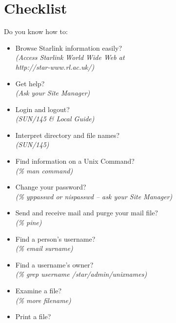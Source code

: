\documentclass[twoside]{article}
\newcommand{\htmladdnormallink}[2]{#1}
\newcommand{\xref}[3]{#1}
\begin{document}
\newpage

\section {\label{AppendixB}Checklist}
Do you know how to:
\begin{itemize}
\item Browse Starlink information easily?\\
\hspace*{10mm} {\em (Access
               \htmladdnormallink{Starlink World Wide Web}
                                 {http://star-www.rl.ac.uk/} at\\
\hspace*{10mm} http://star-www.rl.ac.uk/)}
\item Get help?\\
\hspace*{10mm} {\em (Ask your Site Manager)}
\item Login and logout?\\
\hspace*{10mm} {\em (\xref{SUN/145}{sun145}{} \& Local Guide)}
\item Interpret directory and file names?\\
\hspace*{10mm} {\em (\xref{SUN/145}{sun145}{})}
\item Find information on a Unix Command?\\
\hspace*{10mm} {\em (\% man command)}
\item Change your password?\\
\hspace*{10mm} {\em (\% yppasswd or nispasswd -- ask your Site Manager)}
\item Send and receive mail and purge your mail file?\\
\hspace*{10mm} {\em (\% pine)}
\item Find a person's username?\\
\hspace*{10mm} {\em (\% email surname)}
\item Find a username's owner?\\
\hspace*{10mm} {\em (\% grep username /star/\-admin/\-unixnames)}
\item Examine a file?\\
\hspace*{10mm} {\em (\% more filename)}
\item Print a file?\\

\end{itemize}
\end{document}

